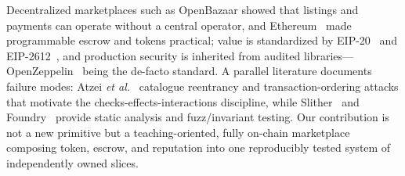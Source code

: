Decentralized marketplaces such as OpenBazaar showed that listings and payments can operate without a central operator, and Ethereum~\cite{buterin2014ethereum} made programmable escrow and tokens practical; value is standardized by EIP-20~\cite{eip20} and EIP-2612~\cite{eip2612}, and production security is inherited from audited libraries---OpenZeppelin~\cite{openzeppelin} being the de-facto standard. A parallel literature documents failure modes: Atzei \emph{et al.}~\cite{atzei2017survey} catalogue reentrancy and transaction-ordering attacks that motivate the checks-effects-interactions discipline, while Slither~\cite{feist2019slither} and Foundry~\cite{foundry} provide static analysis and fuzz/invariant testing. Our contribution is not a new primitive but a teaching-oriented, fully on-chain marketplace composing token, escrow, and reputation into one reproducibly tested system of independently owned slices.
